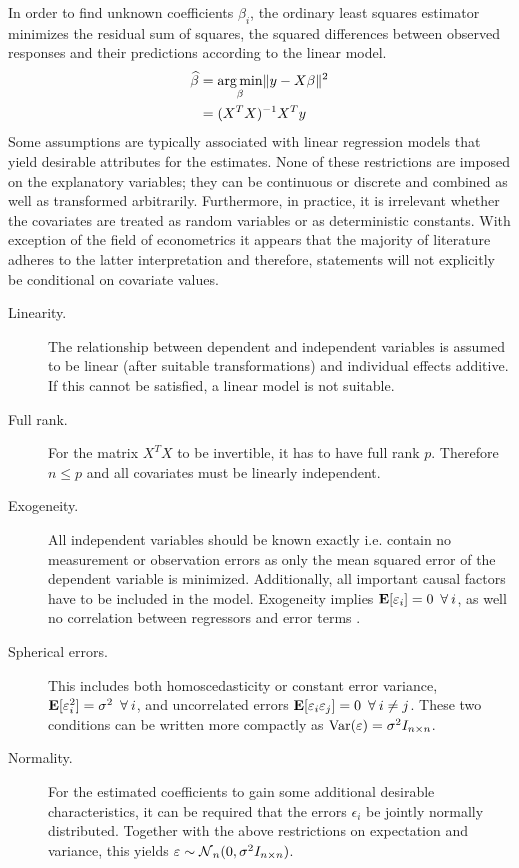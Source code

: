 In order to find unknown coefficients $\beta_i$, the ordinary least squares estimator minimizes the residual sum of squares, the squared differences between observed responses and their predictions according to the linear model.
\begin{subequations}
\begin{align}
  \widehat{\beta} &= \operatorname*{arg\, min}_{\beta} \lVert y - X \beta\rVert^2 \\
         &= (X^T X)^{-1} X^T y \label{eq:ols-estimate}
\end{align}
\end{subequations}
Some assumptions are typically associated with linear regression models that yield desirable attributes for the estimates. None of these restrictions are imposed on the explanatory variables; they can be continuous or discrete and combined as well as transformed arbitrarily. Furthermore, in practice, it is irrelevant whether the covariates are treated as random variables or as deterministic constants. With exception of the field of econometrics it appears that the majority of literature adheres to the latter interpretation and therefore, statements will not explicitly be conditional on covariate values.
\begin{description}
  \item[Linearity.] The relationship between dependent and independent variables is assumed to be linear (after suitable transformations) and individual effects additive. If this cannot be satisfied, a linear model is not suitable.
  \item[Full rank.] For the matrix $X^T X$ to be invertible, it has to have full rank $p$. Therefore $n \leq p$ and all covariates must be linearly independent.
  \item[Exogeneity.] All independent variables should be known exactly i.e. contain no measurement or observation errors as only the mean squared error of the dependent variable is minimized. Additionally, all important causal factors have to be included in the model. Exogeneity implies $\Erw[\epsilon_i] = 0 \forall i$, as well no correlation between regressors and error terms \citep{Hayashi2000}.
  \item[Spherical errors.] This includes both homoscedasticity or constant error variance, $\Erw[\epsilon_i^2] = \sigma^2 \forall i$, and uncorrelated errors $\Erw[\epsilon_i \epsilon_j] = 0 \forall i \neq j$. These two conditions can be written more compactly as $\operatorname{Var}(\varepsilon) = \sigma^2I_{n \times n}$.
  \item[Normality.] For the estimated coefficients to gain some additional desirable characteristics, it can be required that the errors $\epsilon_i$ be jointly normally distributed. Together with the above restrictions on expectation and variance, this yields $\varepsilon \sim \operatorname{\mathcal{N}}_n(0, \sigma^2 I_{n \times n})$.
\end{description}

